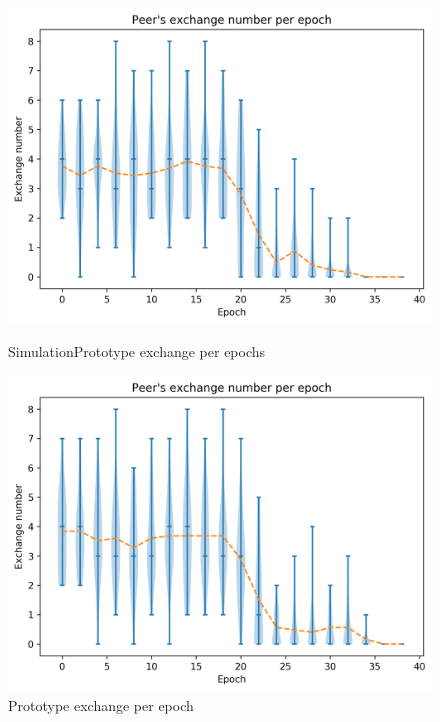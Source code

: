 \documentclass[mscthesis]{usiinfthesis}
\begin{document}
\begin{figure}[H]
   \begin{minipage}{0.49\textwidth}
     \centering
     \includegraphics[width=\linewidth]{images/5/5-exchanges.png}
  	\caption{SimulationPrototype exchange per epochs}
  	\label{fig:sim-one-duplicates}
   \end{minipage}\hfill
   \begin{minipage}{0.49\textwidth}
     \centering
     \includegraphics[width=\linewidth]{images/6/6-exchanges.png}
       \caption{Prototype exchange per epoch}
 		\label{fig:sim-two-duplicates}
   \end{minipage}
\end{figure}
\end{document}
